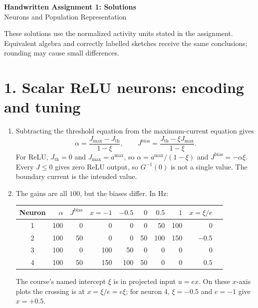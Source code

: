 \documentclass[10pt,letterpaper]{article}
\begin{document}
\begin{center}
{\Large\bfseries Handwritten Assignment 1: Solutions}\\[3pt]
Neurons and Population Representation
\end{center}
\noindent These solutions use the normalized activity units stated in the assignment. Equivalent algebra and correctly labelled sketches receive the same conclusions; rounding may cause small differences.

\section*{1. Scalar ReLU neurons: encoding and tuning}
\begin{enumerate}[label=\textbf{1\alph*.}]
\item Subtracting the threshold equation from the maximum-current equation gives
\[
\boxed{\alpha=\frac{J_{\max}-J_{\mathrm{th}}}{1-\xi}},\qquad
\boxed{J^{\mathrm{bias}}=\frac{J_{\mathrm{th}}-\xi J_{\max}}{1-\xi}}.
\]
For ReLU, \(J_{\mathrm{th}}=0\) and \(J_{\max}=a^{\max}\), so \(\alpha=a^{\max}/(1-\xi)\) and \(J^{\mathrm{bias}}=-\alpha\xi\). Every \(J\leq0\) gives zero ReLU output, so \(G^{-1}(0)\) is not a single value. The boundary current is the intended value.

\item The gains are all \(100\), but the biases differ. In Hz:
\begin{center}\begin{tabular}{c r r r r r r r r r}\toprule
Neuron & \(\alpha\) & \(J^{\mathrm{bias}}\) & \(x=-1\) & \(-0.5\) & \(0\) & \(0.5\) & \(1\) & \(x=\xi/e\)\\\midrule
1 & 100 & 0 & 0 & 0 & 0 & 50 & 100 & 0\\
2 & 100 & 50 & 0 & 0 & 50 & 100 & 150 & \(-0.5\)\\
3 & 100 & 0 & 100 & 50 & 0 & 0 & 0 & 0\\
4 & 100 & 50 & 150 & 100 & 50 & 0 & 0 & \(0.5\)\\\bottomrule
\end{tabular}\end{center}
The course's named intercept \(\xi\) is in projected input \(u=e x\). On these \(x\)-axis plots the crossing is at \(x=\xi/e=e\xi\); for neuron 4, \(\xi=-0.5\) and \(e=-1\) give \(x=+0.5\).


\end{enumerate}
\end{document}
